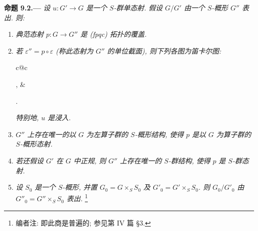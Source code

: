 \medskip
{}\label{prop:sga3-VIB-9.2}%
\noindent\textbf{命题 9.2.---}
\emph{设 \(u:G'\to G\) 是一个 \(S\)-群单态射.
假设 \(G/G'\) 由一个 \(S\)-概形 \(G''\) 表出. 则:}
\begin{enumerate}
\item[\textup{(i)}]\label{concl:sga3-VIB-9.2-i}
  \emph{典范态射 \(p:G\to G''\) 是 \textup{(fpqc)} 拓扑的覆盖.}

\item[\textup{(ii)}]\label{concl:sga3-VIB-9.2-ii}
  \emph{若 \(\varepsilon''=p\circ\varepsilon\)
  \textup{(称此态射为 \(G''\) 的单位截面)}, 则下列各图为笛卡尔图:}
  \begin{center}
    \label{diag:sga3-VIB-9.2-cartesian}%
    \begin{tabular}{c@{\qquad}c}
      ,
      &
      .
    \end{tabular}
  \end{center}
  \emph{特别地, \(u\) 是浸入.}

\item[\textup{(iii)}]\label{concl:sga3-VIB-9.2-iii}
  \emph{\(G''\) 上存在唯一的以 \(G\) 为左算子群的 \(S\)-概形结构,
  使得 \(p\) 是以 \(G\) 为算子群的 \(S\)-概形态射.}

\item[\textup{(iv)}]\label{concl:sga3-VIB-9.2-iv}
  \emph{若还假设 \(G'\) 在 \(G\) 中正规,
  则 \(G''\) 上存在唯一的 \(S\)-群结构,
  使得 \(p\) 是 \(S\)-群态射.}

\item[\textup{(v)}]\label{concl:sga3-VIB-9.2-v}
  \emph{设 \(S_0\) 是一个 \(S\)-概形,
  并置 \(G_0=G\times_SS_0\) 及 \(G'_0=G'\times_SS_0\).
  则 \(G_0/G'_0\) 由 \(G''_0=G''\times_SS_0\) 表出.}%
  \footnote{\label{note:sga3-VIB-85}编者注: 即此商是普遍的;
  参见第 IV 篇 \S3.}


\end{enumerate}
